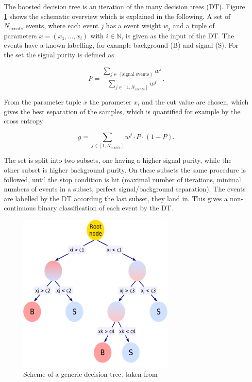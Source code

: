 The boosted decision tree is an iteration of the many decision trees (\gls{DT}). Figure \ref{fig:fig_3_10} shows the schematic overview which is explained in the following. A set of $N_{events}$ events, where each event $j$ has a event weight $w_{j}$ and a tuple of parameters $x = (x_{1}, ... , x_{i})$ with $i \in \mathbb{N}$, is given as the input of the \gls{DT}. The events have a known labelling, for example background (B) and signal (S). For the set the signal purity is defined as

\begin{equation}
	\label{eq:eq_3_10}
	P = \frac{\sum_{j \in (\text{signal events})} w^{j}}{\sum_{j \in [1, N_{events}]} w^{j}}.
\end{equation}

From the parameter tuple $x$ the parameter $x_{i}$ and the cut value are chosen, which gives the best separation of the samples, which is quantified for example by the cross entropy 

\begin{equation}
	\label{eq:eq_3_11}
	g = \sum_{j \in [1, N_{events}]} w^{j} \cdot P \cdot (1-P).
\end{equation}

The set is split into two subsets, one having a higher signal purity, while the other subset is higher background purity. On these subsets the same procedure is followed, until the stop condition is hit (maximal number of iterations, minimal numbers of events in a subset, perfect signal/background separation). The events are labelled by the \gls{DT} according the last subset, they land in. This gives a non-continuous binary classification of each event by the \gls{DT}. \\

\begin{figure}[htp]
	\centering
	\includegraphics[width=0.7\textwidth]{pictures/DT.pdf}

	\caption[DT scheme]{Scheme of a generic decision tree, taken from \cite{TMVA}}
	\label{fig:fig_3_10}
\end{figure}


